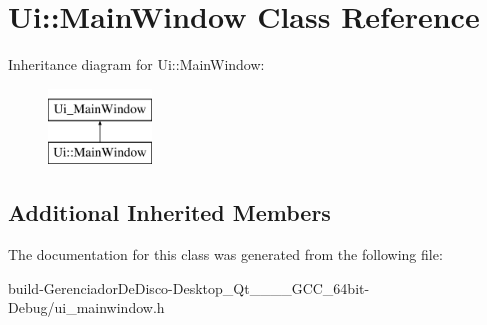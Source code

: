 \hypertarget{classUi_1_1MainWindow}{}\section{Ui\+:\+:Main\+Window Class Reference}
\label{classUi_1_1MainWindow}
Inheritance diagram for Ui\+:\+:Main\+Window\+:\begin{figure}[H]
\begin{center}
\leavevmode
\includegraphics[height=2.000000cm]{classUi_1_1MainWindow}
\end{center}
\end{figure}
\subsection*{Additional Inherited Members}


The documentation for this class was generated from the following file\+:\begin{DoxyCompactItemize}
\item 
build-\/\+Gerenciador\+De\+Disco-\/\+Desktop\+\_\+\+Qt\+\_\+\_\+\_\+\_\+\+G\+C\+C\+\_\+64bit-\/\+Debug/ui\+\_\+mainwindow.\+h\end{DoxyCompactItemize}
